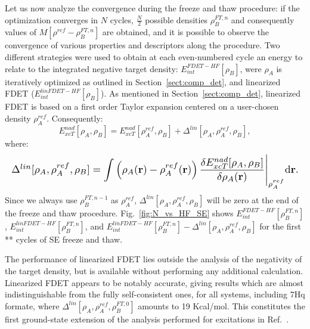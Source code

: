 \documentclass[journal=jctcce,manuscript=article, layout=twocolumn]{achemso}
\begin{document}
Let us now analyze the convergence during the freeze and thaw procedure: if the optimization converges in $N$ cycles, $\frac{N}{2}$ possible densities $\rho_B^{FT,n}$ and consequently values of $M[\rho^{ref} - \rho^{FT,n}_{B}]$ are obtained, and it is possible to observe the convergence of various properties and descriptors along the procedure.
Two different strategies were used to obtain at each even-numbered cycle an energy to relate to the integrated negative target density: $E^{FDET-HF}_{int}[\rho_B]$, were $\rho_A$ is iteratively optimized as outlined in Section~\ref{sect:comp_det}, and linearized FDET ($E^{linFDET-HF}_{int}[\rho_B]$). 
As mentioned in Section~\ref{sect:comp_det}, linearized FDET is based on a first order Taylor expansion centered on a user-chosen density $\rho_A^{ref}$. Consequently:
\begin{equation}
 E_{xcT}^{nad}[\rho_A,\rho_B] = E_{xcT}^{nad}[\rho_A^{ref},\rho_B] + \Delta^{lin}[\rho_A,\rho_A^{ref},\rho_B],
\end{equation}
where:
\begin{equation}\label{eq:delta_lin}
    \resizebox{1.0\columnwidth}{!}{%
        $\Delta^{lin}[\rho_A,\rho_A^{ref},\rho_B]  = \displaystyle\int \left( \rho_A(\mathbf{r}) -  \rho_A^{ref}(\mathbf{r}) \right) \frac{\delta E_{xcT}^{nad}[\rho_A, \rho_B]}{\delta \rho_A(\mathbf{r})}
 \Bigg \vert_{\rho_A^{ref}}
 \mathrm{d}\mathbf{r}.$%
        }
\end{equation}
\vspace{0.5ex}
Since we always use $\rho_B^{FT,n-1}$ as $\rho_A^{ref}$, $\Delta^{lin}[\rho_A,\rho_A^{ref},\rho_B]$ will be zero at the end of the freeze and thaw procedure.
Fig.~\ref{fig:N_vs_HF_SE} shows $E^{FDET-HF}_{int}[\rho_B^{FT,n}]$,  $E^{linFDET-HF}_{int}[\rho_B^{FT,n}]$, and $E^{linFDET-HF}_{int}[\rho_B^{FT,n}] - \Delta^{lin}[\rho_A,\rho_A^{ref},\rho_B]$ for the first ** cycles of SE freeze and thaw.

The performance of linearized FDET lies outside the analysis of the negativity of the target density, but is available without performing any additional calculation.
Linearized FDET appears to be notably accurate, giving results which are almost indistinguishable from the fully self-consistent ones, for all systems, including 7Hq formate, where $\Delta^{lin}[\rho_A,\rho_A^{ref},\rho_B^{FT,0}]$ amounts to 19 Kcal/mol. This constitutes the first ground-state extension of the analysis performed for excitations in Ref.~.
\end{document}
